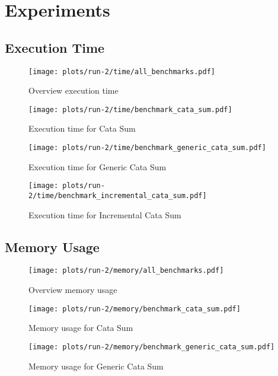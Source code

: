 \section{Experiments}

\subsection{Execution Time}
\begin{figure}[H]
    \centering
    \texttt{[image: plots/run-2/time/all\_benchmarks.pdf]}
    \caption{Overview execution time}
    \label{fig-exec-time-overview}
\end{figure}

\begin{figure}[H]
    \centering
    \texttt{[image: plots/run-2/time/benchmark\_cata\_sum.pdf]}
    \caption{Execution time for Cata Sum}
    \label{fig-exec-time-cata-sum}
\end{figure}

\begin{figure}[H]
    \centering
    \texttt{[image: plots/run-2/time/benchmark\_generic\_cata\_sum.pdf]}
    \caption{Execution time for Generic Cata Sum}
    \label{fig-exec-time-gen-cata-sum}
\end{figure}

\begin{figure}[H]
    \centering
    \texttt{[image: plots/run-2/time/benchmark\_incremental\_cata\_sum.pdf]}
    \caption{Execution time for Incremental Cata Sum}
    \label{fig-exec-time-inc-cata-sum}
\end{figure}


\subsection{Memory Usage}
\begin{figure}[H]
    \centering
    \texttt{[image: plots/run-2/memory/all\_benchmarks.pdf]}
    \caption{Overview memory usage}
    \label{fig-bytes-all-overview}
\end{figure}

\begin{figure}[H]
    \centering
    \texttt{[image: plots/run-2/memory/benchmark\_cata\_sum.pdf]}
    \caption{Memory usage for Cata Sum}
    \label{fig-bytes-all-cata-sum}
\end{figure}

\begin{figure}[H]
    \centering
    \texttt{[image: plots/run-2/memory/benchmark\_generic\_cata\_sum.pdf]}
    \caption{Memory usage for Generic Cata Sum}
    \label{fig-bytes-all-gen-cata-sum}
\end{figure}

